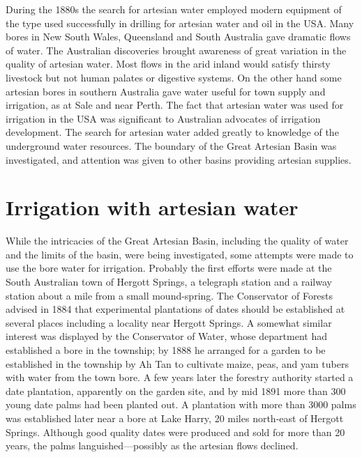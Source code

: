 During the 1880s the search for artesian water employed modern
equipment of the type used successfully in drilling for artesian water
and oil in the USA.  Many bores in New South Wales,
Queensland and South Australia gave dramatic flows of water.  The
Australian discoveries brought awareness of great variation in the
quality of artesian water.  Most flows in the arid inland would
satisfy thirsty livestock but not human palates or digestive systems.
On the other hand some artesian bores in southern Australia gave water
useful for town supply and irrigation, as at Sale and near Perth.  The
fact that artesian water was used for irrigation in the USA
 was significant to Australian advocates of irrigation
development.  The search for artesian water added greatly to knowledge
of the underground water resources.  The boundary of the Great
Artesian Basin was investigated, and attention was given to other
basins providing artesian supplies.

\section*{Irrigation with artesian water}

While the intricacies of the Great Artesian Basin, including the
quality of water and the limits of the basin, were being investigated,
some attempts were made to use the bore water for irrigation.
Probably the first efforts were made at the South Australian town of
Hergott Springs,  a telegraph station and a
railway station about a mile from a small
mound-spring.   The Conservator of Forests advised
in 1884 that experimental plantations of dates should be established
at several places including a locality near Hergott Springs.  A
somewhat similar interest was displayed by the Conservator of Water,
whose department had established a bore in the township; by 1888 he
arranged for a garden to be established in the
township by Ah Tan  to cultivate maize,
peas, and yam tubers with water from the town bore.
A few years later the forestry authority started a date plantation,
apparently on the garden site, and by mid 1891 more than 300 young
date palms had been planted out.  A plantation with more than 3000
palms was established later near a bore at Lake Harry,
 20 miles north-east of Hergott Springs. Although
good quality dates were produced and sold for more than
20 years, the palms languished---possibly as the artesian flows
declined.

